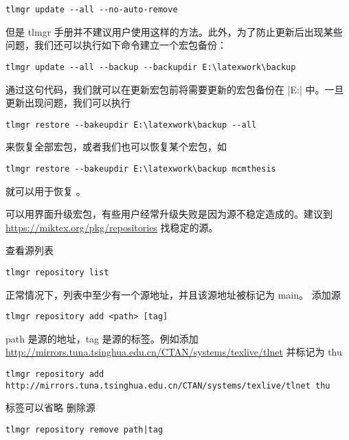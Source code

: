 \begin{verbatim}
tlmgr update --all --no-auto-remove
\end{verbatim}

但是 tlmgr
手册并不建议用户使用这样的方法。此外，为了防止更新后出现某些问题，我们还可以执行如下命令建立一个宏包备份：

\begin{verbatim}
tlmgr update --all --backup --backupdir E:\latexwork\backup
\end{verbatim}

通过这句代码，我们就可以在更新宏包前将需要更新的宏包备份在
|E:\latexwork\backup| 中。一旦更新出现问题，我们可以执行

\begin{verbatim}
tlmgr restore --bakeupdir E:\latexwork\backup --all
\end{verbatim}

来恢复全部宏包，或者我们也可以恢复某个宏包，如

\begin{verbatim}
tlmgr restore --bakeupdir E:\latexwork\backup mcmthesis
\end{verbatim}

就可以用于恢复 。



\MiKTeX{}
可以用界面升级宏包，有些用户经常升级失败是因为源不稳定造成的。建议到
\url{https://miktex.org/pkg/repositories} 找稳定的源。



查看源列表
\begin{verbatim}
tlmgr repository list
\end{verbatim}

正常情况下，列表中至少有一个源地址，并且该源地址被标记为 main。 添加源
\begin{verbatim}
tlmgr repository add <path> [tag]
\end{verbatim}

path 是源的地址，tag 是源的标签。例如添加
\url{http://mirrors.tuna.tsinghua.edu.cn/CTAN/systems/texlive/tlnet} 并标记为 thu
\begin{verbatim}
tlmgr repository add http://mirrors.tuna.tsinghua.edu.cn/CTAN/systems/texlive/tlnet thu
\end{verbatim}

标签可以省略 删除源
\begin{verbatim}
tlmgr repository remove path|tag
\end{verbatim}

